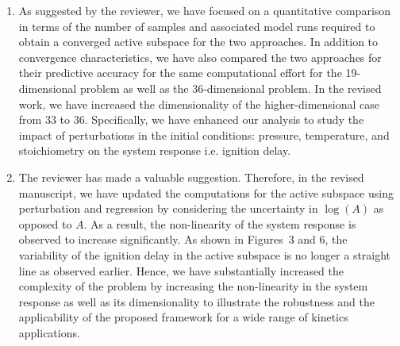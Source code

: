 \documentclass[11pt,final]{article}
\newcommand{\referee}[1]{\vspace{.1ex}\noindent{\textcolor{blue}{#1}}}
\begin{document}
\begin{enumerate}[wide, labelwidth=!, labelindent=0pt]
\item \referee{There is a lack of quantitative discussion of the expense of regression-vs-perturbation,
in terms of the actual number of model simulations required. The work seems to suggest that perturbation
works better than regression, but then it is a direct and clear consequence of the fact that local 
approximation is supposed to be better than a global one. Ideally, much more quantitative comparison
needs to be made here before reaching any meaningful conclusions.}

\noindent  As suggested by the reviewer, we have focused on a quantitative comparison in terms of the
number of samples and associated model runs required to obtain a converged active subspace
for the two approaches. In addition to convergence characteristics, we have also compared
the two approaches for their predictive accuracy for the same computational effort for the
19-dimensional problem as well as the 36-dimensional problem. In the revised work,
we have increased the dimensionality of
the higher-dimensional case from 33 to 36. Specifically, we have enhanced our analysis
to study the impact of perturbations in the initial conditions: pressure, temperature, and
stoichiometry on the system response i.e. ignition delay.

\item \referee{Another fundamental flaw is related to the additive treatment of the uncertainty of 
the pre-exponential factor A. In most works dealing with uncertainty in chemical kinetics, the
uncertainty form is multiplicative or, equivalently, log(A) is the underlying fundamental parameter 
with additive uncertainty range. In the current form of the uncertainty, the problem is too benign,
and barely carries any practical usability for the practitioners.}

\noindent The reviewer has made a valuable suggestion. Therefore, in the revised manuscript, we have
updated the computations for the active subspace using perturbation and regression by considering
the uncertainty in $\log(A)$ as opposed to $A$. As a result, the non-linearity of the system
response is observed to increase significantly. As shown in Figures~3 and 6, 
the variability of the ignition delay in the
active subspace is no longer a straight line as observed earlier. Hence, we have substantially
increased the complexity of the problem by increasing the non-linearity in the system response
as well as its dimensionality to illustrate the robustness and the applicability of the proposed framework
for a wide range of kinetics applications. 


\end{enumerate}
\end{document}
